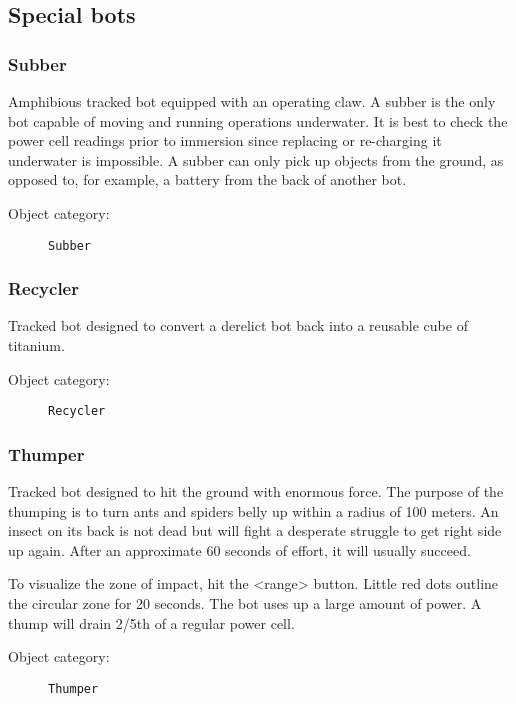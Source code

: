 
\subsection{Special bots}


\subsubsection{Subber}

Amphibious tracked bot equipped with an operating claw. A subber is the only bot capable of moving and running operations underwater. It is best to check the power cell readings prior to immersion since replacing or re-charging it underwater is impossible. A subber can only pick up objects from the ground, as opposed to, for example, a battery from the back of another bot.

\begin{description}
    \item[Object category:] \texttt{Subber}
\end{description}


\subsubsection{Recycler}

Tracked bot designed to convert a derelict bot back into a reusable cube of titanium.

\begin{description}
    \item[Object category:] \texttt{Recycler}
\end{description}


\subsubsection{Thumper}

Tracked bot designed to hit the ground with enormous force. The purpose of the thumping is to turn ants and spiders belly up within a radius of 100 meters. An insect on its back is not dead but will fight a desperate struggle to get right side up again. After an approximate 60 seconds of effort, it will usually succeed.

To visualize the zone of impact, hit the <range> button. Little red dots outline the circular zone for 20 seconds. The bot uses up a large amount of power. A thump will drain 2/5th of a regular power cell.

\begin{description}
    \item[Object category:] \texttt{Thumper}
\end{description}


